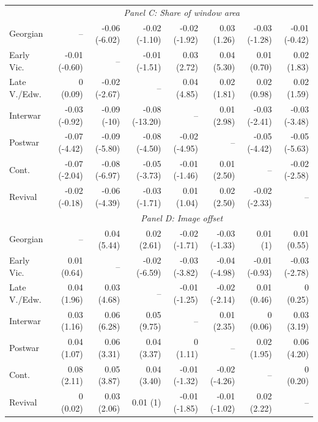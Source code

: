 \documentclass[]{article}
\begin{document}
\begin{table}[!htb]
\begin{tabular}{lrrrrrrr}
\cmidrule(lr){1-1} \cmidrule(lr){2-8} 
 & \multicolumn{7}{c}{\emph{ Panel C: Share of window area}}\\ 
\cmidrule(lr){1-1} \cmidrule(lr){2-8} 

 Georgian &  -- & -0.06 (-6.02) & -0.02 (-1.10) & -0.02 (-1.92) &  0.03 (1.26) & -0.03 (-1.28) & -0.01 (-0.42) \\  
  Early Vic. & -0.01 (-0.60) &  -- & -0.01 (-1.51) &  0.03 (2.72) &  0.04 (5.30) &  0.01 (0.70) &  0.02 (1.83) \\  
  Late V./Edw. &  0 (0.09) & -0.02 (-2.67) &  -- &  0.04 (4.85) &  0.02 (1.81) &  0.02 (0.98) &  0.02 (1.59) \\  
  Interwar & -0.03 (-0.92) & -0.09 (-10) & -0.08 (-13.20) &  -- &  0.01 (2.98) & -0.03 (-2.41) & -0.03 (-3.48) \\  
  Postwar & -0.07 (-4.42) & -0.09 (-5.80) & -0.08 (-4.50) & -0.02 (-4.95) &  -- & -0.05 (-4.42) & -0.05 (-5.63) \\  
  Cont. & -0.07 (-2.04) & -0.08 (-6.97) & -0.05 (-3.73) & -0.01 (-1.46) &  0.01 (2.50) &  -- & -0.02 (-2.58) \\  
  Revival & -0.02 (-0.18) & -0.06 (-4.39) & -0.03 (-1.71) &  0.01 (1.04) &  0.02 (2.50) & -0.02 (-2.33) &  -- \\    

\cmidrule(lr){1-1} \cmidrule(lr){2-8} 
 & \multicolumn{7}{c}{\emph{ Panel D: Image offset}}\\ 
\cmidrule(lr){1-1} \cmidrule(lr){2-8} 

 Georgian &  -- &  0.04 (5.44) &  0.02 (2.61) & -0.02 (-1.71) & -0.03 (-1.33) &  0.01 (1) &  0.01 (0.55) \\  
  Early Vic. &  0.01 (0.64) &  -- & -0.02 (-6.59) & -0.03 (-3.82) & -0.04 (-4.98) & -0.01 (-0.93) & -0.03 (-2.78) \\  
  Late V./Edw. &  0.04 (1.96) &  0.03 (4.68) &  -- & -0.01 (-1.25) & -0.02 (-2.14) &  0.01 (0.46) &  0 (0.25) \\  
  Interwar &  0.03 (1.16) &  0.06 (6.28) &  0.05 (9.75) &  -- &  0.01 (2.35) &  0 (0.06) &  0.03 (3.19) \\  
  Postwar &  0.04 (1.07) &  0.06 (3.31) &  0.04 (3.37) &  0 (1.11) &  -- &  0.02 (1.95) &  0.06 (4.20) \\  
  Cont. &  0.08 (2.11) &  0.05 (3.87) &  0.04 (3.40) & -0.01 (-1.32) & -0.02 (-4.26) &  -- &  0 (0.20) \\  
  Revival &  0 (0.02) &  0.03 (2.06) &  0.01 (1) & -0.01 (-1.85) & -0.01 (-1.02) &  0.02 (2.22) &  -- \\  
\bottomrule 
 

\end{tabular}
\end{table}
\end{document}

